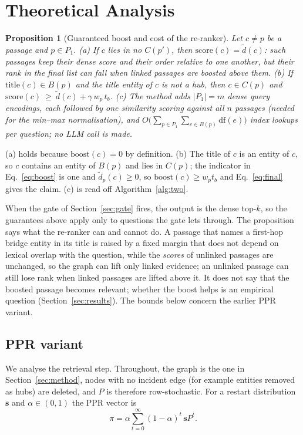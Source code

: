 \documentclass[a4paper,fleqn]{cas-sc}
\newtheorem{proposition}{Proposition}
\begin{document}
\section{Theoretical Analysis}\label{sec:theory}
\begin{proposition}[Guaranteed boost and cost of the re-ranker]\label{prop:boost}
Let $c\ne p$ be a passage and $p\in P_1$. (a) If $c$ lies in no $C(p')$, then $\mathrm{score}(c)=\widetilde d(c)$: such passages keep their dense score and their order relative to one another, but their rank in the final list can fall when linked passages are boosted above them. (b) If $\mathrm{title}(c)\in B(p)$ and the title entity of $c$ is not a hub, then $c\in C(p)$ and $\mathrm{score}(c)\ \ge\ \widetilde d(c)+\gamma\,w_p\,t_b$. (c) The method adds $|P_1|=m$ dense query encodings, each followed by one similarity scoring against all $n$ passages (needed for the min--max normalisation), and $O\big(\sum_{p\in P_1}\sum_{e\in B(p)}\mathrm{df}(e)\big)$ index lookups per question; no LLM call is made.
\end{proposition}
\begin{pf}
(a) holds because $\mathrm{boost}(c)=0$ by definition. (b) The title of $c$ is an entity of $c$, so $c$ contains an entity of $B(p)$ and lies in $C(p)$; the indicator in Eq.~\eqref{eq:boost} is one and $\widetilde d_p(c)\ge0$, so $\mathrm{boost}(c)\ge w_pt_b$ and Eq.~\eqref{eq:final} gives the claim. (c) is read off Algorithm~\ref{alg:two}.
\end{pf}
When the gate of Section~\ref{sec:gate} fires, the output is the dense top-$k$, so the guarantees above apply only to questions the gate lets through. The proposition says what the re-ranker can and cannot do. A passage that names a first-hop bridge entity in its title is raised by a fixed margin that does not depend on lexical overlap with the question, while the \emph{scores} of unlinked passages are unchanged, so the graph can lift only linked evidence; an unlinked passage can still lose rank when linked passages are lifted above it. It does not say that the boosted passage becomes relevant; whether the boost helps is an empirical question (Section~\ref{sec:results}). The bounds below concern the earlier PPR variant.

\subsection{PPR variant}
We analyse the retrieval step. Throughout, the graph is the one in Section~\ref{sec:method}, nodes with no incident edge (for example entities removed as hubs) are deleted, and $P$ is therefore row-stochastic. For a restart distribution $\mathbf{s}$ and $\alpha\in(0,1)$ the PPR vector is
\begin{equation}
\pi=\alpha\sum_{t=0}^{\infty}(1-\alpha)^t\,\mathbf{s}P^t .
\label{eq:pprseries}
\end{equation}
\end{document}
